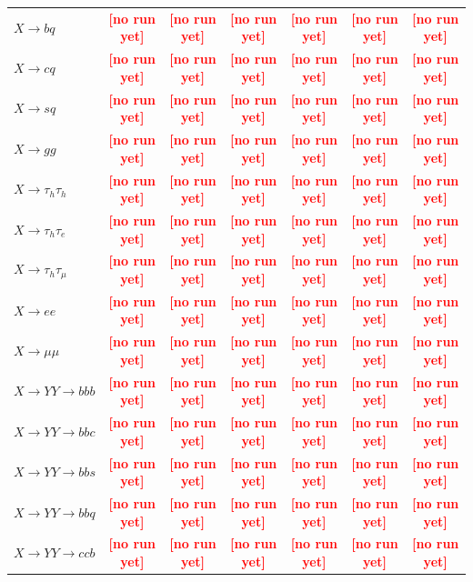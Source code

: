\documentclass[12pt]{article}   %
\newcommand{\pending}[1]{\textcolor{red}{\textbf{[#1]}}}
\begin{document}
\begin{landscape}
{\begin{longtable}{@{\extracolsep{\fill}}lcccccc@{}}
$X\to bq$ & \pending{no run yet} & \pending{no run yet} & \pending{no run yet} & \pending{no run yet} & \pending{no run yet} & \pending{no run yet} \\
$X\to cq$ & \pending{no run yet} & \pending{no run yet} & \pending{no run yet} & \pending{no run yet} & \pending{no run yet} & \pending{no run yet} \\
$X\to sq$ & \pending{no run yet} & \pending{no run yet} & \pending{no run yet} & \pending{no run yet} & \pending{no run yet} & \pending{no run yet} \\
$X\to gg$ & \pending{no run yet} & \pending{no run yet} & \pending{no run yet} & \pending{no run yet} & \pending{no run yet} & \pending{no run yet} \\
\midrule
$X\to \tau_h\tau_h$ & \pending{no run yet} & \pending{no run yet} & \pending{no run yet} & \pending{no run yet} & \pending{no run yet} & \pending{no run yet} \\
\midrule
$X\to \tau_h\tau_e$ & \pending{no run yet} & \pending{no run yet} & \pending{no run yet} & \pending{no run yet} & \pending{no run yet} & \pending{no run yet} \\
$X\to \tau_h\tau_\mu$ & \pending{no run yet} & \pending{no run yet} & \pending{no run yet} & \pending{no run yet} & \pending{no run yet} & \pending{no run yet} \\
\midrule
$X\to ee$ & \pending{no run yet} & \pending{no run yet} & \pending{no run yet} & \pending{no run yet} & \pending{no run yet} & \pending{no run yet} \\
$X\to \mu\mu$ & \pending{no run yet} & \pending{no run yet} & \pending{no run yet} & \pending{no run yet} & \pending{no run yet} & \pending{no run yet} \\
\midrule
$X\to YY\to bbb$ & \pending{no run yet} & \pending{no run yet} & \pending{no run yet} & \pending{no run yet} & \pending{no run yet} & \pending{no run yet} \\
$X\to YY\to bbc$ & \pending{no run yet} & \pending{no run yet} & \pending{no run yet} & \pending{no run yet} & \pending{no run yet} & \pending{no run yet} \\
$X\to YY\to bbs$ & \pending{no run yet} & \pending{no run yet} & \pending{no run yet} & \pending{no run yet} & \pending{no run yet} & \pending{no run yet} \\
$X\to YY\to bbq$ & \pending{no run yet} & \pending{no run yet} & \pending{no run yet} & \pending{no run yet} & \pending{no run yet} & \pending{no run yet} \\
$X\to YY\to ccb$ & \pending{no run yet} & \pending{no run yet} & \pending{no run yet} & \pending{no run yet} & \pending{no run yet} & \pending{no run yet} \\

\end{longtable}}
\end{landscape}
\end{document}
